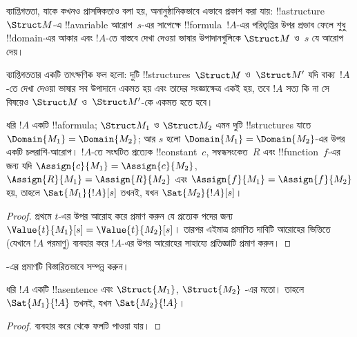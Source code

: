 \documentclass[../../../include/open-logic-section]{subfiles}
\begin{document}


\begin{explain}
ব্যাপ্তিগততা, যাকে কখনও প্রাসঙ্গিকতাও বলা হয়, অনানুষ্ঠানিকভাবে এভাবে
প্রকাশ করা যায়: !!a{structure}~$\Struct M$-এ !!a{variable} আরোপ~$s$-এর
সাপেক্ষে !!{formula}~$!A$-এর পরিতৃপ্তির উপর প্রভাব ফেলে শুধু
!!{domain}-এর আকার এবং $!A$-তে বাস্তবে দেখা দেওয়া ভাষার উপাদানগুলিকে
$\Struct M$ ও~$s$ যে আরোপ দেয়।

ব্যাপ্তিগততার একটি তাৎক্ষণিক ফল হলো: দুটি !!{structure}s~$\Struct M$
ও~$\Struct M'$ যদি বাক্য~$!A$-তে দেখা দেওয়া ভাষার সব উপাদানে একমত হয়
এবং তাদের সংজ্ঞাক্ষেত্র একই হয়, তবে $!A$ সত্য কি না সে বিষয়েও
$\Struct M$ ও~$\Struct M'$-কে একমত হতে হবে।
\end{explain}

\begin{prop}[ব্যাপ্তিগততা]
  ধরি $!A$ একটি !!a{formula}; $\Struct M_1$ ও $\Struct M_2$ এমন দুটি
  !!{structure}s যাতে $\Domain{M_1} = \Domain{M_2}$; আর $s$ হলো
  $\Domain{M_1} = \Domain{M_2}$-এর উপর একটি চলরাশি-আরোপ। $!A$-তে
  সংঘটিত প্রত্যেক !!{constant}~$c$, সম্বন্ধসংকেত~$R$ এবং
  !!{function}~$f$-এর জন্য যদি $\Assign{c}{M_1} = \Assign{c}{M_2}$,
  $\Assign{R}{M_1}=\Assign{R}{M_2}$ এবং
  $\Assign{f}{M_1} = \Assign{f}{M_2}$ হয়, তাহলে
  $\Sat{M_1}{!A}[s]$ তখনই, যখন $\Sat{M_2}{!A}[s]$।
\end{prop}

\begin{proof}
  প্রথমে $t$-এর উপর আরোহ করে প্রমাণ করুন যে প্রত্যেক পদের জন্য
  $\Value{t}{M_1}[s] = \Value{t}{M_2}[s]$। তারপর এইমাত্র প্রমাণিত
  দাবিটি আরোহের ভিত্তিতে (যেখানে $!A$ পরমাণু) ব্যবহার করে $!A$-এর উপর
  আরোহের সাহায্যে প্রতিজ্ঞাটি প্রমাণ করুন।
\end{proof}

\begin{prob}
-এর প্রমাণটি বিস্তারিতভাবে
সম্পন্ন করুন।
\end{prob}

\begin{cor}
  ধরি $!A$ একটি !!a{sentence} এবং $\Struct{M_1}$, $\Struct{M_2}$
  -এর মতো। তাহলে $\Sat{M_1}{!A}$ তখনই,
  যখন $\Sat{M_2}{!A}$।
\end{cor}

\begin{proof}
 ব্যবহার করে
 থেকে ফলটি পাওয়া যায়।
\end{proof}
\end{document}

